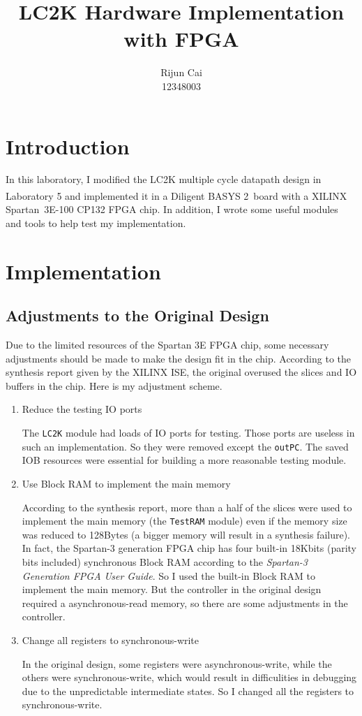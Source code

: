 \documentclass[a4paper]{article}
\title{LC2K Hardware Implementation with FPGA}
\author{Rijun Cai\\12348003}
\begin{document}
\maketitle

\section{Introduction}
In this laboratory, I modified the LC2K multiple cycle datapath design in Laboratory 5 and implemented it
in a Diligent\textsuperscript{\textregistered} BASYS 2\texttrademark~board with a
XILINX\textsuperscript{\textregistered} Spartan\texttrademark~3E-100 CP132 FPGA chip.
In addition, I wrote some useful modules and tools to help test my implementation.

\section{Implementation}
\subsection{Adjustments to the Original Design}
Due to the limited resources of the Spartan 3E FPGA chip, some necessary adjustments should be made to
make the design fit in the chip. According to the synthesis report given by the XILINX ISE, the original
overused the slices and IO buffers in the chip. Here is my adjustment scheme.
\begin{enumerate}
    \item Reduce the testing IO ports

        The \verb|LC2K| module had loads of IO ports for testing. Those ports are useless in such an
        implementation. So they were removed except the \verb|outPC|. The saved IOB resources were essential
        for building a more reasonable testing module.

    \item Use Block RAM to implement the main memory

        According to the synthesis report, more than a half of the slices were used to implement the main
        memory (the \verb|TestRAM| module) even if the memory size was reduced to 128Bytes (a bigger memory
        will result in a synthesis failure). In fact, the Spartan-3 generation FPGA chip has four built-in 18Kbits
        (parity bits included) synchronous Block RAM according to the \emph{Spartan-3 Generation FPGA User Guide}.
        So I used the built-in Block RAM to implement the main memory. But the controller in the original design 
        required a asynchronous-read memory, so there are some adjustments in the controller.

    \item Change all registers to synchronous-write

        In the original design, some registers were asynchronous-write, while the others were
        synchronous-write, which would result in difficulities in debugging due to the unpredictable intermediate
        states. So I changed all the registers to synchronous-write.

\end{enumerate}
\end{document}
